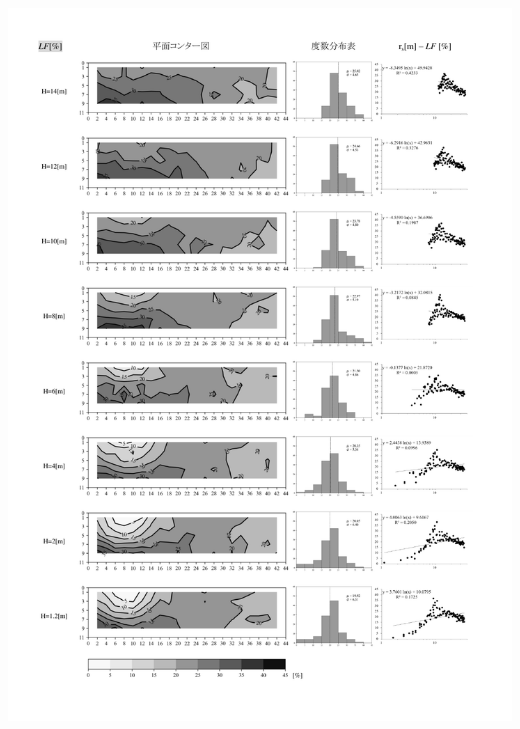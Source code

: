       \begin{minipage}{1\hsize}
        \centering
          \includegraphics[keepaspectratio,width=1\hsize,angle=0]
                          {04_att/Onkyo_rec6.pdf}
      \end{minipage}      
\newpage
